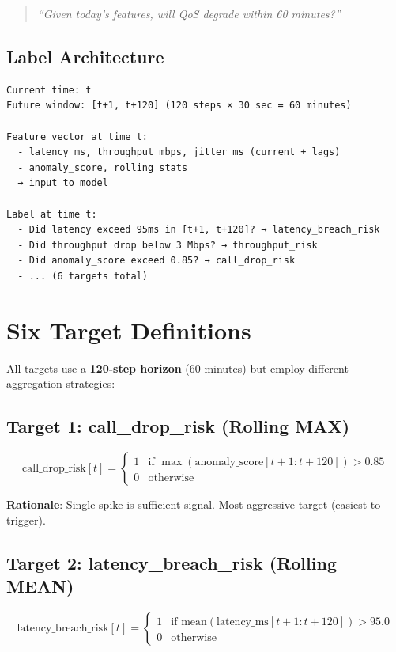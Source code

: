 \documentclass[11pt,a4paper,oneside]{report}
\begin{document}
\begin{quote}
\textit{``Given today's features, will QoS degrade within 60 minutes?''}
\end{quote}

\subsection{Label Architecture}

\begin{verbatim}
Current time: t
Future window: [t+1, t+120] (120 steps × 30 sec = 60 minutes)

Feature vector at time t:
  - latency_ms, throughput_mbps, jitter_ms (current + lags)
  - anomaly_score, rolling stats
  → input to model

Label at time t:
  - Did latency exceed 95ms in [t+1, t+120]? → latency_breach_risk
  - Did throughput drop below 3 Mbps? → throughput_risk
  - Did anomaly_score exceed 0.85? → call_drop_risk
  - ... (6 targets total)
\end{verbatim}

\section{Six Target Definitions}

All targets use a \textbf{120-step horizon} (60 minutes) but employ different aggregation strategies:

\subsection{Target 1: call\_drop\_risk (Rolling MAX)}

\begin{equation*}
\text{call\_drop\_risk}[t] = \begin{cases}
1 & \text{if } \max(\text{anomaly\_score}[t+1:t+120]) > 0.85 \\
0 & \text{otherwise}
\end{cases}
\end{equation*}

\textbf{Rationale}: Single spike is sufficient signal. Most aggressive target (easiest to trigger).

\subsection{Target 2: latency\_breach\_risk (Rolling MEAN)}

\begin{equation*}
\text{latency\_breach\_risk}[t] = \begin{cases}
1 & \text{if } \text{mean}(\text{latency\_ms}[t+1:t+120]) > 95.0 \\
0 & \text{otherwise}
\end{cases}
\end{equation*}
\end{document}

